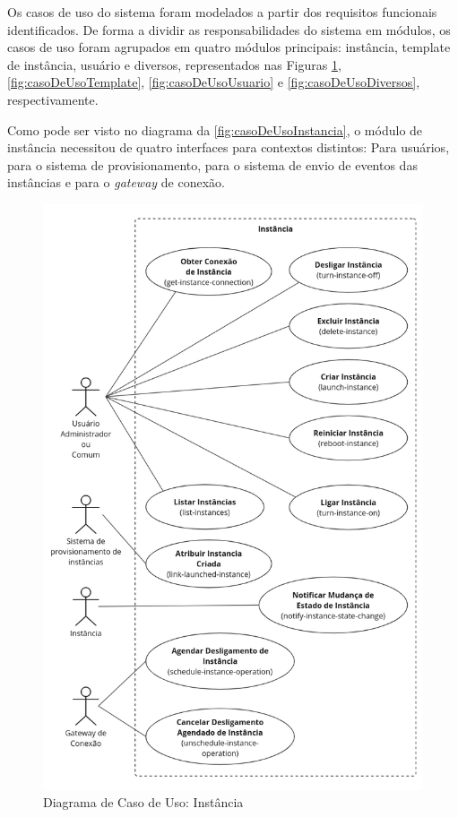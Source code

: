 Os casos de uso do sistema foram modelados a partir dos requisitos funcionais identificados. De forma a dividir as responsabilidades do sistema em módulos, os casos de uso foram agrupados em quatro módulos principais: instância, template de instância, usuário e diversos, representados nas Figuras \ref{fig:casoDeUsoInstancia}, \ref{fig:casoDeUsoTemplate}, \ref{fig:casoDeUsoUsuario} e \ref{fig:casoDeUsoDiversos}, respectivamente.

Como pode ser visto no diagrama da \autoref{fig:casoDeUsoInstancia}, o módulo de instância necessitou de quatro interfaces para contextos distintos: Para usuários, para o sistema de provisionamento, para o sistema de envio de eventos das instâncias e para o \textit{gateway} de conexão.

\begin{figure}[H]
\caption{Diagrama de Caso de Uso: Instância}
\label{fig:casoDeUsoInstancia}
\includegraphics[width=\textwidth]{capitulos/2-metodologia/files/use-case-instance.png}
\end{figure}


